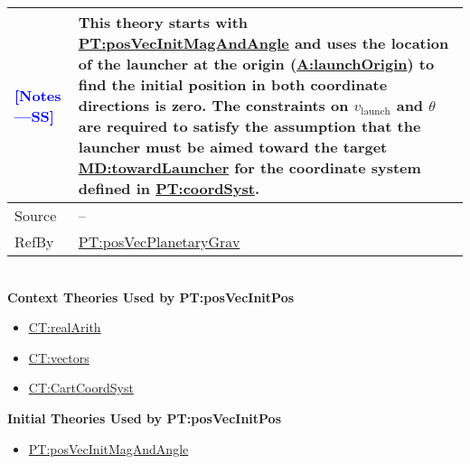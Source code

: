 \documentclass[12pt]{article}
\newcommand{\authornote}[3]{\textcolor{#1}{[#3 ---#2]}}
\newcommand{\authornote}[3]{}
\newcommand{\wss}[1]{\authornote{blue}{SS}{#1}}
\begin{document}
\begin{minipage}{\textwidth}
\begin{tabular}{>{\raggedright}p{}>{\raggedright\arraybackslash}p{}}
\\ \midrule \wss{Notes} & This theory starts with
\hyperref[PT:posVecInitMagAndAngle]{PT:posVecInitMagAndAngle} and uses the
location of the launcher at the origin
(\hyperref[A:launchOrigin]{A:launchOrigin}) to find the initial position in both
coordinate directions is zero. The constraints on $v_\text{launch}$ and $\theta$
are required to satisfy the assumption that the launcher must be aimed toward
the target \hyperref[MD:towardLauncher]{MD:towardLauncher} for the coordinate system
defined in \hyperref[PT:coordSyst]{PT:coordSyst}.

\\ \midrule
Source & --
         
\\ \midrule
RefBy & \hyperref[PT:posVecPlanetaryGrav]{PT:posVecPlanetaryGrav}

\\ \bottomrule
\end{tabular}
\end{minipage}
~\\

\noindent \textbf{Context Theories Used by PT:posVecInitPos}

\begin{itemize}
\item \hyperref[CT:realArith]{CT:realArith}
\item \hyperref[CT:vectors]{CT:vectors}
\item \hyperref[CT:CartCoordSyst]{CT:CartCoordSyst}
\end{itemize}

\noindent \textbf{Initial Theories Used by PT:posVecInitPos}

\begin{itemize}
\item \hyperref[PT:posVecInitMagAndAngle]{PT:posVecInitMagAndAngle}
\end{itemize}
\end{document}
